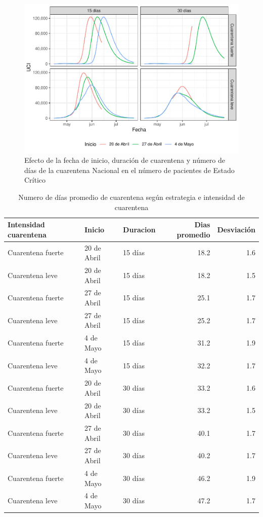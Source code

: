 \documentclass[]{article}
\begin{document}
\begin{figure}
\centering
\includegraphics{Informe_Mesa_2020_04_16_files/figure-latex/InicioDuracionUCI-1.pdf}
\caption{\label{fig:InicioDuracionUCI}Efecto de la fecha de inicio, duración de cuarentena y número de días de la cuarentena Nacional en el número de pacientes de Estado Crítico}
\end{figure}

\begin{table}

\caption{\label{tab:DiasCuar2}Numero de días promedio de cuarentena según estrategia e intensidad de cuarentena}
\centering
\begin{tabular}[t]{lllrr}
\toprule
Intensidad cuarentena & Inicio & Duracion & Dias promedio & Desviación\\
\midrule
Cuarentena fuerte & 20 de Abril & 15 días & 18.2 & 1.6\\
Cuarentena leve & 20 de Abril & 15 días & 18.2 & 1.5\\
Cuarentena fuerte & 27 de Abril & 15 días & 25.1 & 1.7\\
Cuarentena leve & 27 de Abril & 15 días & 25.2 & 1.7\\
Cuarentena fuerte & 4 de Mayo & 15 días & 31.2 & 1.9\\
\addlinespace
Cuarentena leve & 4 de Mayo & 15 días & 32.2 & 1.7\\
Cuarentena fuerte & 20 de Abril & 30 días & 33.2 & 1.6\\
Cuarentena leve & 20 de Abril & 30 días & 33.2 & 1.5\\
Cuarentena fuerte & 27 de Abril & 30 días & 40.1 & 1.7\\
Cuarentena leve & 27 de Abril & 30 días & 40.2 & 1.7\\
\addlinespace
Cuarentena fuerte & 4 de Mayo & 30 días & 46.2 & 1.9\\
Cuarentena leve & 4 de Mayo & 30 días & 47.2 & 1.7\\
\bottomrule
\end{tabular}
\end{table}
\end{document}
